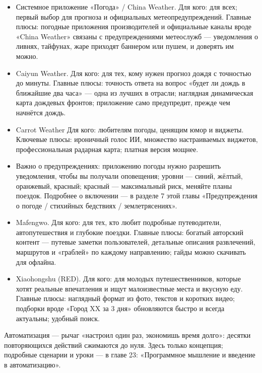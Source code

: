 \begin{itemize}
  \item Системное приложение «Погода» / China Weather. Для кого: для всех; первый выбор для прогноза и официальных метеопредупреждений. Главные плюсы: погодные приложения производителей и официальные каналы вроде «China Weather» связаны с предупреждениями метеослужб — уведомления о ливнях, тайфунах, жаре приходят баннером или пушем, и доверять им можно.
  \item Caiyun Weather. Для кого: для тех, кому нужен прогноз дождя с точностью до минуты. Главные плюсы: точность ответа на вопрос «будет ли дождь в ближайшие два часа» — одна из лучших в отрасли; наглядная динамическая карта дождевых фронтов; приложение само предупредит, прежде чем начнётся дождь.
  \item Carrot Weather Для кого: любителям погоды, ценящим юмор и виджеты. Ключевые плюсы: ироничный голос ИИ, множество настраиваемых виджетов, профессиональная радарная карта; платная версия мощнее.
  \item Важно о предупреждениях: приложению погоды нужно разрешить уведомления, чтобы вы получали оповещения; уровни — синий, жёлтый, оранжевый, красный; красный — максимальный риск, меняйте планы поездок. Подробнее о включении — в разделе 7 этой главы «Предупреждения о погоде / стихийных бедствиях / землетрясениях».
\end{itemize}


\begin{itemize}
  \item Mafengwo. Для кого: для тех, кто любит подробные путеводители, автопутешествия и глубокие поездки. Главные плюсы: богатый авторский контент — путевые заметки пользователей, детальные описания развлечений, маршрутов и «граблей» по каждому направлению; гайды можно скачивать для офлайна.
  \item Xiaohongshu (RED). Для кого: для молодых путешественников, которые хотят реальные впечатления и ищут малоизвестные места и вкусную еду. Главные плюсы: наглядный формат из фото, текстов и коротких видео; подборки вроде «Город XX за 3 дня» обновляются быстро и всегда актуальны; удобный поиск.
\end{itemize}


Автоматизация — рычаг «настроил один раз, экономишь время долго»: десятки повторяющихся действий сжимаются до нуля. Здесь только концепция; подробные сценарии и уроки — в главе 23: «Программное мышление и введение в автоматизацию».

